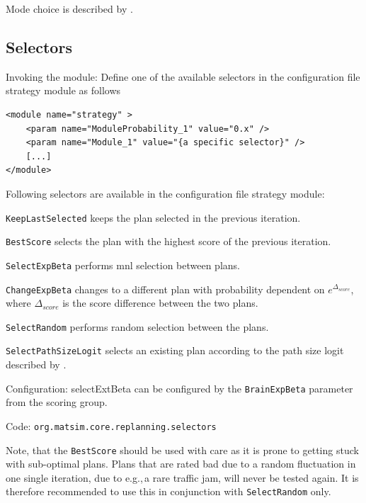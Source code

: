 Mode choice is described by \citet[][]{RieserEtAl_TRR_2009, MeisterEtAl_WCTRS_2010, CiariEtAl_STRC_2008, CiariEtAl_STRC_2007}.

\subsection{Selectors}
\label{sec:selectors}
\begin{compactitem}
\item Invoking the module: Define one of the available selectors in the configuration file strategy module as follows
%
\begin{lstlisting}
<module name="strategy" >
    <param name="ModuleProbability_1" value="0.x" />
    <param name="Module_1" value="{a specific selector}" />
    [...]
</module>
\end{lstlisting}
%
Following selectors are available in the configuration file strategy module:
%
\begin{compactitem}
	\item \lstinline|KeepLastSelected| keeps the plan selected in the previous iteration.
	\item \lstinline|BestScore| selects the plan with the highest score of the previous iteration.
	\item \lstinline|SelectExpBeta| performs \gls{mnl} selection between plans.
	\item \lstinline|ChangeExpBeta| changes to a different plan with probability dependent on $e^{\Delta_{score}}$, where $\Delta_{score}$ is the score difference between the two plans.
	\item \lstinline|SelectRandom| performs random selection between the plans.
	\item \lstinline|SelectPathSizeLogit| selects an existing plan according to the path size logit described by \citet[][]{FrejingerBierlaire_TransResB_2007}.
\end{compactitem}
%
\item Configuration: selectExtBeta can be configured by the \lstinline|BrainExpBeta| parameter from the scoring group.
\item Code: \lstinline|org.matsim.core.replanning.selectors|
\end{compactitem}

Note, that the \lstinline|BestScore| should be used with care as it is prone to getting stuck with sub-optimal plans. Plans that are rated bad due to a random fluctuation in one single iteration, due to e.g.,\,a rare traffic jam, will never be tested again. It is therefore recommended to use this in conjunction with \lstinline|SelectRandom| only.


